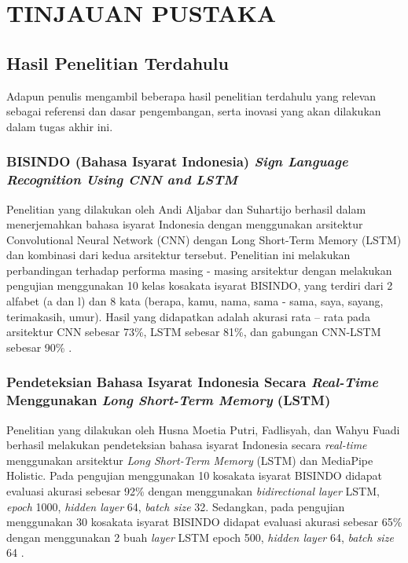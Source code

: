 \chapter{TINJAUAN PUSTAKA}
\label{chap:tinjauanpustaka}



\section{Hasil Penelitian Terdahulu}
Adapun penulis mengambil beberapa hasil penelitian terdahulu yang relevan sebagai referensi dan dasar pengembangan, serta inovasi yang akan dilakukan dalam tugas akhir ini.

\subsection{BISINDO (Bahasa Isyarat Indonesia) \textit{Sign Language Recognition Using CNN and LSTM}}
Penelitian yang dilakukan oleh Andi Aljabar dan Suhartijo berhasil dalam menerjemahkan bahasa isyarat Indonesia dengan menggunakan arsitektur Convolutional Neural Network (CNN) dengan Long Short-Term Memory (LSTM) dan kombinasi dari kedua arsitektur tersebut. Penelitian ini melakukan perbandingan terhadap performa masing - masing arsitektur dengan melakukan pengujian  menggunakan 10 kelas kosakata isyarat BISINDO, yang terdiri dari 2 alfabet (a dan l) dan 8 kata (berapa, kamu, nama, sama - sama, saya, sayang, terimakasih, umur). Hasil yang didapatkan adalah akurasi rata – rata pada arsitektur CNN sebesar 73\%, LSTM sebesar 81\%, dan gabungan CNN-LSTM sebesar 90\% \parencite{aljabar2020}.

\subsection{Pendeteksian Bahasa Isyarat Indonesia Secara \textit{Real-Time} Menggunakan \textit{Long Short-Term Memory} (LSTM)}
Penelitian yang dilakukan oleh Husna Moetia Putri, Fadlisyah, dan Wahyu Fuadi berhasil melakukan pendeteksian bahasa isyarat Indonesia secara \emph{real-time} menggunakan arsitektur \emph{Long Short-Term Memory} (LSTM) dan MediaPipe Holistic. Pada pengujian menggunakan 10 kosakata isyarat BISINDO didapat evaluasi akurasi sebesar 92\% dengan menggunakan \emph{bidirectional layer} LSTM, \emph{epoch} 1000, \emph{hidden layer} 64, \emph{batch size} 32. Sedangkan, pada pengujian menggunakan 30 kosakata isyarat BISINDO didapat evaluasi akurasi sebesar 65\% dengan menggunakan 2 buah \emph{layer} LSTM epoch 500, \emph{hidden layer} 64, \emph{batch size} 64 \parencite{putri2022}.
 
